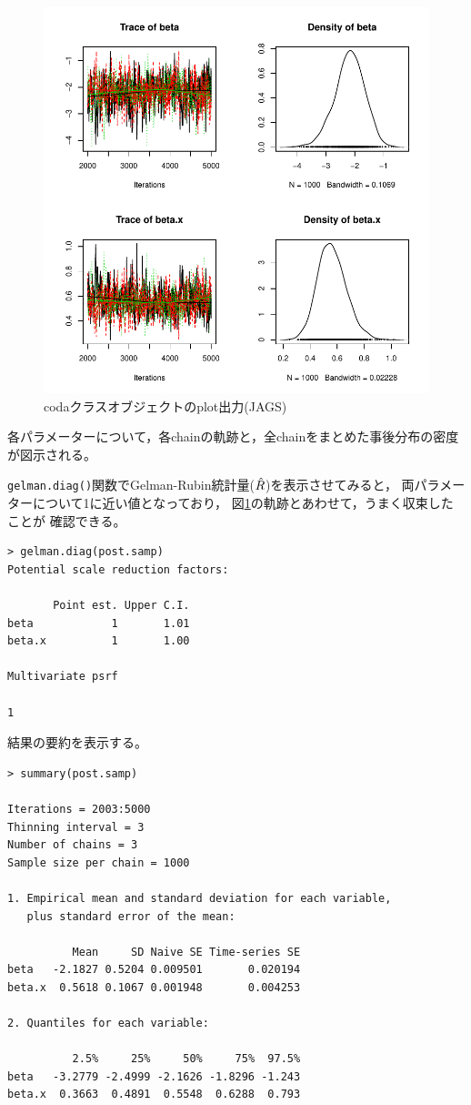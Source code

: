 \documentclass[11pt,uplatex]{jsarticle}
\begin{document}
\begin{figure}[htbp]
	\begin{center}
		\includegraphics[bb=0 0 400 400, clip, width=300 bp]{example2_jags_results.pdf}
	\end{center}
	\caption{\textsf{coda}クラスオブジェクトのplot出力(JAGS)}
	\label{plot_coda}
\end{figure}
\noindent
各パラメーターについて，各chainの軌跡と，全chainをまとめた事後分布の密度が図示される。

\texttt{gelman.diag()}関数でGelman-Rubin統計量($\Hat{R}$)を表示させてみると，
両パラメーターについて1に近い値となっており，
図\ref{plot_coda}の軌跡とあわせて，うまく収束したことが
確認できる。
\begin{lstlisting}
> gelman.diag(post.samp)
Potential scale reduction factors:

       Point est. Upper C.I.
beta            1       1.01
beta.x          1       1.00

Multivariate psrf

1
\end{lstlisting}

\pagebreak

結果の要約を表示する。
\begin{lstlisting}
> summary(post.samp)

Iterations = 2003:5000
Thinning interval = 3 
Number of chains = 3 
Sample size per chain = 1000 

1. Empirical mean and standard deviation for each variable,
   plus standard error of the mean:

          Mean     SD Naive SE Time-series SE
beta   -2.1827 0.5204 0.009501       0.020194
beta.x  0.5618 0.1067 0.001948       0.004253

2. Quantiles for each variable:

          2.5%     25%     50%     75%  97.5%
beta   -3.2779 -2.4999 -2.1626 -1.8296 -1.243
beta.x  0.3663  0.4891  0.5548  0.6288  0.793

\end{lstlisting}
\end{document}
